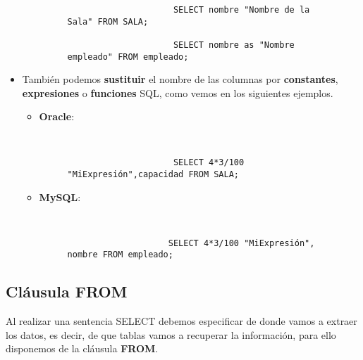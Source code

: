 \begin{itemize}
\begin{itemize}
\begin{figure}[H]
\begin{tcolorbox}[sharp corners, colback=yellow!30, colframe=white!20]
\begin{verbatim}
                     SELECT nombre "Nombre de la Sala" FROM SALA;

                     SELECT nombre as "Nombre empleado" FROM empleado;
             \end{verbatim}
         \end{tcolorbox}
         \end{figure}
    \end{itemize}

    \item También podemos \textbf{sustituir} el nombre de las columnas por \textbf{\gls{constantes}}, \textbf{\gls{expresiones}} o \textbf{\gls{funciones}} SQL, como vemos en los siguientes ejemplos.

    \begin{itemize}
        \item \textbf{Oracle}:

        \begin{figure}[h]
            \begin{tcolorbox}[sharp corners, colback=yellow!30, colframe=white!20]
                \scriptsize
                \begin{verbatim}


                     SELECT 4*3/100 "MiExpresión",capacidad FROM SALA;
                \end{verbatim}
            \end{tcolorbox}
        \end{figure}

        \item \textbf{MySQL}:

         \begin{figure}[h]
            \begin{tcolorbox}[sharp corners, colback=yellow!30, colframe=white!20]
                \scriptsize
                \begin{verbatim}


                    SELECT 4*3/100 "MiExpresión", nombre FROM empleado;
                \end{verbatim}
            \end{tcolorbox}
        \end{figure}
    \end{itemize}
\end{itemize}

\subsection{Cláusula FROM}
Al realizar una sentencia SELECT debemos especificar de donde vamos a extraer los datos, es decir, de que tablas vamos a recuperar la información, para ello disponemos de la cláusula \textbf{FROM}.

